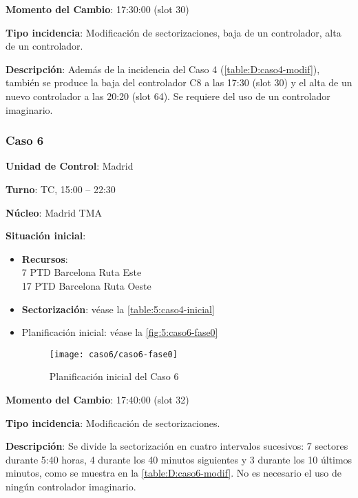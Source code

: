 \textbf{Momento del Cambio}: 17:30:00 (slot 30)

\textbf{Tipo incidencia}: Modificación de sectorizaciones, baja de un controlador, alta de un controlador.

\textbf{Descripción}: Además de la incidencia del Caso 4 (\autoref{table:D:caso4-modif}), también se produce la baja del controlador C8 a las 17:30 (slot 30) y el alta de un nuevo controlador a las 20:20 (slot 64). Se requiere del uso de un controlador imaginario.

\subsubsection{Caso 6}

\textbf{Unidad de Control}: Madrid

\textbf{Turno}: TC, 15:00 -- 22:30

\textbf{Núcleo}: Madrid TMA

\textbf{Situación inicial}:
\begin{itemize}[label={}]
	
	\item \textbf{Recursos}: \\
	7 PTD Barcelona Ruta Este \\
	17 PTD Barcelona Ruta Oeste
	
	
	\item \textbf{Sectorización}: véase la \autoref{table:5:caso4-inicial}
	
	\item Planificación inicial: véase la \autoref{fig:5:caso6-fase0}
	
	\begin{figure}[!h]
		\centering
		\texttt{[image: caso6/caso6-fase0]}
		\caption{Planificación inicial del Caso 6}
		\label{fig:5:caso6-fase0}
	\end{figure}
	
	
\end{itemize}

\textbf{Momento del Cambio}: 17:40:00 (slot 32)

\textbf{Tipo incidencia}: Modificación de sectorizaciones.

\textbf{Descripción}: Se divide la sectorización en cuatro intervalos sucesivos: 7 sectores durante 5:40 horas, 4 durante los 40 minutos siguientes y 3 durante los 10 últimos minutos, como se muestra en la \autoref{table:D:caso6-modif}. No es necesario el uso de ningún controlador imaginario.


